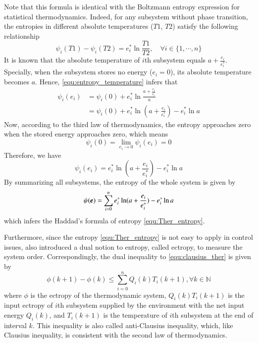 \documentclass[preprint,authoryear,12pt]{elsarticle}
\renewcommand{\vec}[1]{\mbox{\boldmath$#1$}}
\begin{document}
Note that this formula is identical with the Boltzmann entropy expression for statistical thermodynamics. Indeed, for any subsystem without phase transition, the entropies in different absolute temperatures ($T1$, $T2$) satisfy the following relationship \citep{cengel_thermodynamics:_2001}
\begin{equation}\label{equ:entropy_temperature}
\psi_i(T1)-\psi_i(T2)=e_i^* \ln \frac{T1}{T2},\quad \forall
i\in\{1,\cdots,n\}
\end{equation}
It is known that the absolute temperature of $i$th subsystem equals $a+\frac{e_i}{e_i^*}$. Specially, when the subsystem stores no energy ($e_i=0$), its absolute temperature becomes $a$. Hence, \eqref{equ:entropy_temperature} infers that
\begin{align}
\psi_i(e_i)&=\psi_i(0)+e_i^* \ln \frac{a+\frac{e_i}{e_i^*}}{a}
\nonumber\\
&=\psi_i(0)+e_i^* \ln (a+\frac{e_i}{e_i^*})-e_i^* \ln{a}
\label{equ:tmp_psi_1}
\end{align}
Now, according to the third law of thermodynamics, the entropy approaches zero when the stored energy approaches zero, which means
\begin{equation}\label{equ:entropy_zero}
\psi_i(0)=\lim_{e_i\rightarrow 0}\psi_i(e_i)=0
\end{equation}
Therefore, we have
\begin{equation}
\psi_i(e_i)=e_i^* \ln (a+\frac{e_i}{e_i^*})-e_i^* \ln{a}
\end{equation}
By summarizing all subsystems, the entropy of the whole system is given by
\begin{equation}
\psi(\vec{e})=\sum_{i=0}^n e_i^*\ln(a+\frac{e_i}{e_i^*})-e_i^*\ln a
\end{equation}
which infers the Haddad's formula of entropy \eqref{equ:Ther_entropy}.

Furthermore, since the entropy \eqref{equ:Ther_entropy} is not easy to apply in control issues, \citet{haddad_thermodynamic_2005} also introduced a dual notion to entropy, called ectropy, to measure the system order. Correspondingly, the dual inequality to \eqref{equ:clausius_ther} is given by
\begin{equation}\label{equ:anti_clausius}
\phi(k+1)-\phi(k)\le \sum_{i=0}^n Q_i(k)T_i(k+1),
\forall k\in\mathbb{N}
\end{equation}
where $\phi$ is the ectropy of the thermodynamic system, $Q_i(k)T_i(k+1)$ is the input ectropy of $i$th subsystem supplied by the environment with the net input energy $Q_i(k)$, and $T_i(k+1)$ is the temperature of $i$th subsystem at the end of interval $k$. This inequality is also called anti-Clausius inequality, which, like Clausius inequality, is consistent with the second law of thermodynamics.
\end{document}
